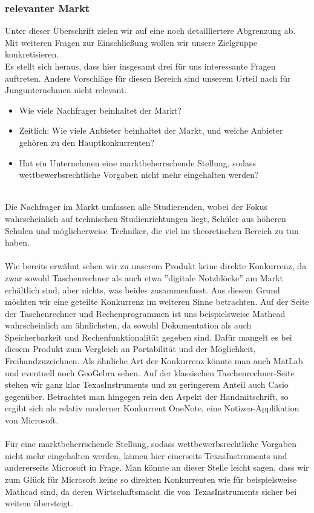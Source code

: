 \subsubsection{relevanter Markt}
Unter dieser Überschrift zielen wir auf eine noch detailliertere Abgrenzung ab. Mit weiteren Fragen zur Einschließung wollen wir unsere Zielgruppe konkretisieren.\\
Es stellt sich heraus, dass hier insgesamt drei für uns interessante Fragen auftreten. Andere Vorschläge für diesen Bereich sind unserem Urteil nach für Jungunternehmen nicht relevant.\\

\begin{itemize}
	\item Wie viele Nachfrager beinhaltet der Markt?
	\item Zeitlich: Wie viele Anbieter beinhaltet der Markt, und welche Anbieter gehören zu den Hauptkonkurrenten?
	\item Hat ein Unternehmen eine marktbeherrschende Stellung, sodass wettbewerbsrechtliche Vorgaben nicht mehr eingehalten werden?
\end{itemize}
\ \\
Die Nachfrager im Markt umfassen alle Studierenden, wobei der Fokus wahrscheinlich auf technischen Studienrichtungen liegt, Schüler aus höheren Schulen und möglicherweise Techniker, die viel im theoretischen Bereich zu tun haben.\\
\\
Wie bereits erwähnt sehen wir zu unserem Produkt keine direkte Konkurrenz, da zwar sowohl Taschenrechner als auch etwa ''digitale Notzblöcke'' am Markt erhältlich sind, aber nichts, was beides zusammenfasst. Aus diesem Grund möchten wir eine geteilte Konkurrenz im weiteren Sinne betrachten. Auf der Seite der Taschenrechner und Rechenprogrammen ist uns beispielsweise Mathcad wahrscheinlich am ähnlichsten, da sowohl Dokumentation als auch Speicherbarkeit und Rechenfunktionalität gegeben sind. Dafür mangelt es bei diesem Produkt zum Vergleich an Portabilität und der Möglichkeit, Freihandzuzeichnen. Als ähnliche Art der Konkurrenz könnte man auch MatLab und eventuell noch GeoGebra sehen. Auf der klassischen Taschenrechner-Seite stehen wir ganz klar TexasInstruments und zu geringerem Anteil auch Casio gegenüber. Betrachtet man hingegen rein den Aspekt der Handmitschrift, so ergibt sich als relativ moderner Konkurrent OneNote, eine Notizen-Applikation von Microsoft.\\
\\
Für eine marktbeherrschende Stellung, sodass wettbewerbsrechtliche Vorgaben nicht mehr eingehalten werden, kämen hier einerseits TexasInstruments und andererseits Microsoft in Frage. Man könnte an dieser Stelle leicht sagen, dass wir zum Glück für Microsoft keine so direkten Konkurrenten wie für beispielsweise Mathcad sind, da deren Wirtschaftsmacht die von TexasInstruments sicher bei weitem übersteigt.\\

